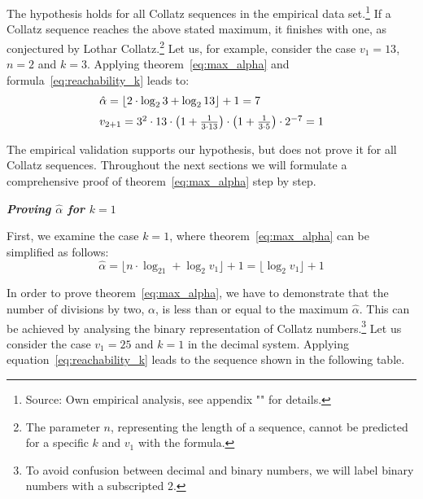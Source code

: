 \documentclass{SciPress_2015}
\renewcommand{\subsection}[1]{\textit{\textbf{#1}}}
\begin{document}
The hypothesis holds for all Collatz sequences in the empirical data set.\footnote{Source: Own empirical analysis, see appendix "" for details.} If a Collatz sequence reaches the above stated maximum, it finishes with one, as conjectured by Lothar Collatz.\footnote{The parameter $n$, representing the length of a sequence, cannot be predicted for a specific $k$ and $v_1$ with the formula.} Let us, for example, consider the case $v_1=13$, $n=2$ and $k=3$. Applying theorem~\ref{eq:max_alpha} and formula~\ref{eq:reachability_k} leads to:
\[
\begin{array}{l}
\hat\alpha=\lfloor 2\cdot\log_23+\log_213\rfloor+1=7\\[\medskipamount]
v_{2+1}=3^2\cdot 13\cdot\left(1+\frac{1}{3\cdot13}\right)\cdot\left(1+\frac{1}{3\cdot5}\right)\cdot2^{-7}=1
\end{array}
\]

\par\noindent
The empirical validation supports our hypothesis, but does not prove it for all Collatz sequences. Throughout the next sections we will formulate a comprehensive proof of theorem~\ref{eq:max_alpha} step by step.

\vspace{1em}\noindent
\subsection{Proving \boldmath$\hat\alpha$ for \boldmath$k=1$}
\par\noindent
First, we examine the case $k=1$, where theorem~\ref{eq:max_alpha} can be simplified as follows:
\begin{equation}
\label{eq:max_alpha_1}
\hat\alpha=\lfloor n\cdot\log_21+\log_2v_1\rfloor+1=\lfloor\log_2v_1\rfloor+1
\end{equation}

\par\noindent
In order to prove theorem~\ref{eq:max_alpha}, we have to demonstrate that the number of divisions by two, $\alpha$, is less than or equal to the maximum $\hat\alpha$. This can be achieved by analysing the binary representation of Collatz numbers.\footnote{To avoid confusion between decimal and binary numbers, we will label binary numbers with a subscripted $2$.} Let us consider the case $v_1=25$ and $k=1$ in the decimal system. Applying equation~\ref{eq:reachability_k} leads to the sequence shown in the following table.
\end{document}
